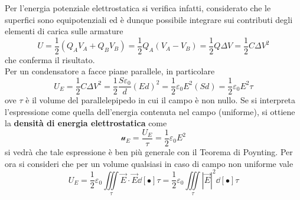 Per l'energia potenziale elettrostatica si verifica infatti, considerato che le superfici sono equipotenziali ed è dunque possibile integrare sui contributi degli elementi di carica sulle armature
\[U = \frac{1}{2}(Q_A V_A + Q_B V_B) = \frac{1}{2} Q_A (V_A - V_B) = \frac{1}{2} Q \Delta V = \frac{1}{2} C \Delta V^2\]
che conferma il risultato.
\\Per un condensatore a facce piane parallele, in particolare
\[U_E = \frac{1}{2} C \Delta V^2 = \frac{1}{2} \frac{S \varepsilon_0}{d} (E d)^2 = \frac{1}{2} \varepsilon_0 E^2 (Sd) = \frac{1}{2} \varepsilon_0 E^2 \tau\]
ove $\tau$ è il volume del parallelepipedo in cui il campo è non nullo. Se si interpreta l'espressione come quella dell'energia contenuta nel campo (uniforme), si ottiene la \textbf{densità di energia elettrostatica} come
\[\mathcal{u}_E = \frac{U_E}{\tau} = \frac{1}{2} \varepsilon_0 E^2\]
si vedrà che tale espressione è ben più generale con il Teorema di Poynting. Per ora si consideri che per un volume qualsiasi in caso di campo non uniforme vale
\[U_E = \frac{1}{2} \varepsilon_0 \iiint\limits_\tau \vec{E} \cdot \vec{E} \dd[•]{\tau} = \frac{1}{2} \varepsilon_0 \iiint\limits_\tau |\vec{E}|^2 \dd[•]{\tau}\]

